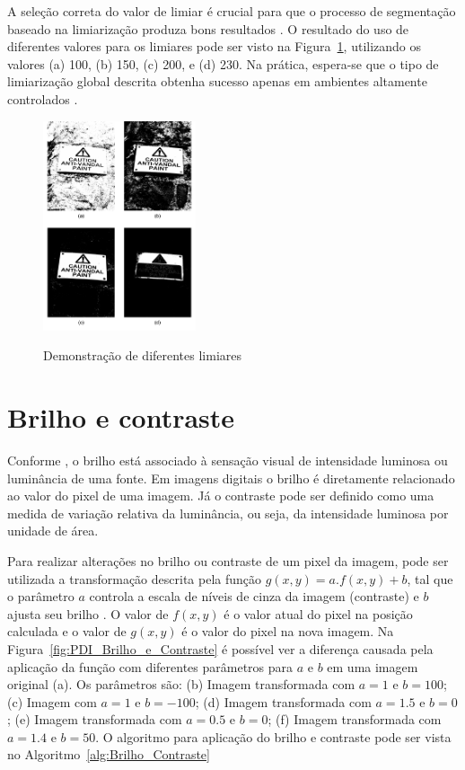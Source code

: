 \documentclass[12pt,oneside,a4paper,english,french,spanish,brazil,]{abntex2}
\begin{document}
A seleção correta do valor de limiar é crucial para que o processo de segmentação baseado na limiarização produza bons resultados \cite{pedrini:2008}. O resultado do uso de diferentes valores para os limiares pode ser visto na Figura~\ref{fig:PDI_Limiarizacao_2}, utilizando os valores (a) 100, (b) 150, (c) 200, e (d) 230. Na prática, espera-se que o tipo de limiarização global descrita obtenha sucesso apenas em ambientes altamente controlados \cite{gonzalez:2012}.

\begin{figure}[ht]
\centering
\caption{Demonstração de diferentes limiares}
\includegraphics[width=0.4\textwidth]{imagens/PDI_Limiarizacao_2.pdf}
\sourceAuthor
\label{fig:PDI_Limiarizacao_2}
\end{figure}

\section{Brilho e contraste}

Conforme \citet{pedrini:2008}, o brilho está associado à sensação visual de intensidade luminosa ou luminância de uma fonte. Em imagens digitais o brilho é diretamente relacionado ao valor do pixel de uma imagem. Já o contraste pode ser definido como uma medida de variação relativa da luminância, ou seja, da intensidade luminosa por unidade de área.

Para realizar alterações no brilho ou contraste de um pixel da imagem, pode ser utilizada a transformação descrita pela função \(g(x,y)=a.f(x,y)+b\), tal que o parâmetro \(a\) controla a escala de níveis de cinza da imagem (contraste) e \(b\) ajusta seu brilho \cite{pedrini:2008}. O valor de \(f(x,y)\) é o valor atual do pixel na posição calculada e o valor de \(g(x,y)\) é o valor do pixel na nova imagem. Na Figura~\ref{fig:PDI_Brilho_e_Contraste} é possível ver a diferença causada pela aplicação da função com diferentes parâmetros para \(a\) e \(b\) \cite{pedrini:2008} em uma imagem original (a). Os parâmetros são: (b) Imagem transformada com \(a=1\) e \(b=100\); (c) Imagem com \(a=1\) e \(b=-100\); (d) Imagem transformada com \(a=1.5\) e \(b=0\); (e) Imagem transformada com \(a=0.5\) e \(b=0\); (f) Imagem transformada com \(a=1.4\) e \(b=50\). O algoritmo para aplicação do brilho e contraste pode ser vista no Algoritmo~\ref{alg:Brilho_Contraste} 
\end{document}
